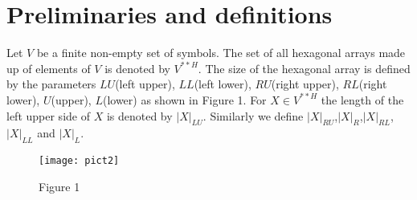\documentclass[11pt]{article}
\begin{document}
\section{Preliminaries and definitions}
Let $V$ be a finite non-empty set of symbols. The set of all
hexagonal arrays made up of elements of $V$ is denoted by
$V^{**H}$. The size of the hexagonal array is defined by the
parameters $LU$(left upper), $LL$(left lower), $RU$(right upper),
$RL$(right lower), $U$(upper), $L$(lower) as shown in Figure 1.
For $X\in V^{**H}$ the length of the left upper side of $X$ is
denoted by $\left| X\right|_{LU}$. Similarly we define
$\left|X\right|_{RU}$,$\left|X\right|_{R}$,$\left|
X\right|_{RL}$,$\left| X\right|_{LL}$ and $\left| X\right|_{L}$.


\begin{figure}
    \begin{center}
        \texttt{[image: pict2]}
    \end{center}
    \centerline{Figure 1}
\end{figure}
\end{document}
